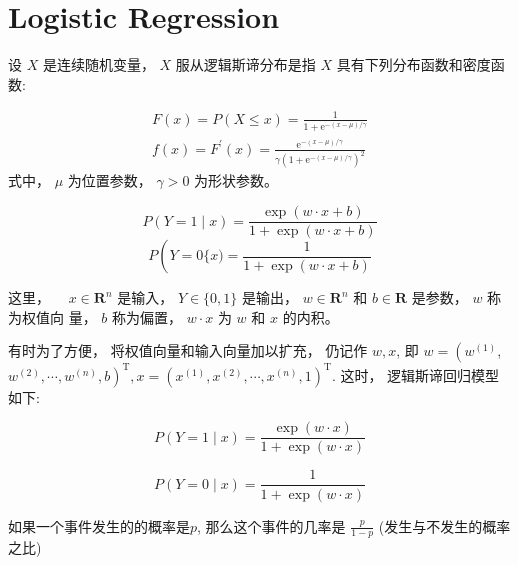\chapter{Logistic Regression}

\begin{definition}
    设 $ X $ 是连续随机变量， $ X $ 服从逻辑斯谛分布是指 $ X $ 具有下列分布函数和密度函数:

    \begin{equation}
\begin{array}{l}
F(x)=P(X \leqslant x)=\frac{1}{1+\mathrm{e}^{-(x-\mu) / \gamma}} \\
f(x)=F^{\prime}(x)=\frac{\mathrm{e}^{-(x-\mu) / \gamma}}{\gamma\left(1+\mathrm{e}^{-(x-\mu) / \gamma}\right)^{2}}
\end{array}
\end{equation}
式中， $ \mu $ 为位置参数， $ \gamma>0 $ 为形状参数。
\end{definition}



\begin{definition}
    \begin{equation} P(Y=1 \mid x)=\frac{\exp (w \cdot x+b)}{1+\exp (w \cdot x+b)} \end{equation}
\begin{equation} P\left(Y=0\{x)=\frac{1}{1+\exp (w \cdot x+b)}\right. \end{equation}

这里， $\quad x \in \mathbf{R}^{n}$ 是输入， $Y \in\{0,1\}$ 是输出， $w \in \mathbf{R}^{n}$ 和 $b \in \mathbf{R}$ 是参数， $w$ 称为权值向 量， $b$ 称为偏置， $w \cdot x$ 为 $w$ 和 $x$ 的内积。
\end{definition}

有时为了方便， 将权值向量和输入向量加以扩充， 仍记作 $ w, x $, 即 $ w=\left(w^{(1)}\right. $, $ \left.w^{(2)}, \cdots, w^{(n)}, b\right)^{\mathrm{T}}, x=\left(x^{(1)}, x^{(2)}, \cdots, x^{(n)}, 1\right)^{\mathrm{T}} $. 这时， 逻辑斯谛回归模型如下:

\begin{equation} P(Y=1 \mid x)=\frac{\exp (w \cdot x)}{1+\exp (w \cdot x)} \end{equation}

\begin{equation} P(Y=0 \mid x)=\frac{1}{1+\exp (w \cdot x)} \end{equation}

\begin{definition}[几率]
    如果一个事件发生的的概率是$p$, 那么这个事件的几率是 $ \frac{p}{1-p} $ (发生与不发生的概率之比)
\end{definition}


